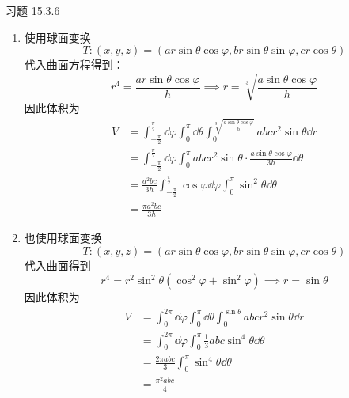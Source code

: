 \begin{problem}
	习题 15.3.6
	\begin{solution}
		\begin{enumerate}
			\item[\textbf{1)}] 使用球面变换
			$$
			T: (x, y, z) = (a r \sin \theta \cos \varphi, b r \sin \theta \sin \varphi, c r \cos \theta)
			$$
			代入曲面方程得到：
			$$
			r^4 = \frac{a r \sin \theta \cos \varphi}{h} \implies r = \sqrt[3]{\frac{a \sin \theta \cos \varphi}{h}}
			$$
			因此体积为
			$$
			\begin{aligned}
				V & = \int_{-\frac{\pi}{2}}^{\frac{\pi}{2}} \dd{\varphi} \int_{0}^{\pi} \dd{\theta} \int_{0}^{\sqrt[3]{\frac{a \sin \theta \cos \varphi}{h}}} a b c r^2 \sin \theta \dd{r} \\
				& = \int_{-\frac{\pi}{2}}^{\frac{\pi}{2}} \dd{\varphi} \int_{0}^{\pi} a b c r^2 \sin \theta \cdot \frac{a \sin \theta \cos \varphi}{3 h}  \dd{\theta} \\
				& = \frac{a^2 b c}{3 h} \int_{-\frac{\pi}{2}}^{\frac{\pi}{2}} \cos \varphi \dd{\varphi} \int_{0}^{\pi} \sin^2 \theta \dd{\theta} \\
				& = \frac{\pi a^2 b c}{3 h}
			\end{aligned}
			$$
			\item[\textbf{2)}] 也使用球面变换
			$$
			T: (x, y, z) = (a r \sin \theta \cos \varphi, b r \sin \theta \sin \varphi, c r \cos \theta)
			$$
			代入曲面得到
			$$
			r^4 = r^2 \sin^2 \theta (\cos^2 \varphi + \sin^2 \varphi) \implies r = \sin \theta
			$$
			因此体积为
			$$
			\begin{aligned}
				V & = \int_{0}^{2\pi} \dd{\varphi} \int_{0}^{\pi} \dd{\theta} \int_{0}^{\sin \theta} a b c r^2 \sin \theta \dd{r} \\
				& = \int_{0}^{2\pi} \dd{\varphi} \int_{0}^{\pi} \frac{1}{3} a b c \sin^4 \theta \dd{\theta} \\
				& = \frac{2 \pi a b c}{3} \int_{0}^{\pi} \sin^4 \theta \dd{\theta} \\
				& = \frac{\pi^2 a b c}{4}
			\end{aligned}
			$$

		\end{enumerate}
	\end{solution}
\end{problem}
